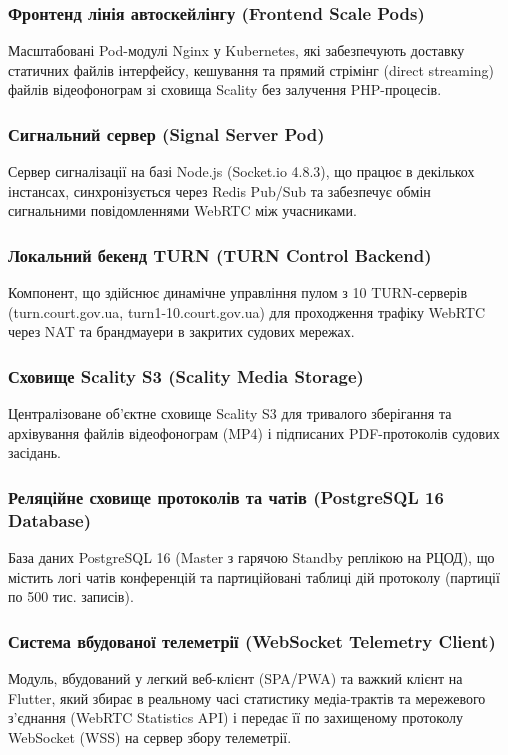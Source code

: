 \documentclass{article}
\begin{document}
\subsubsection{Фронтенд лінія автоскейлінгу (Frontend Scale Pods)}
Масштабовані Pod-модулі Nginx у Kubernetes, які забезпечують доставку статичних файлів інтерфейсу, кешування та прямий стрімінг (direct streaming) файлів відеофонограм зі сховища Scality без залучення PHP-процесів.

\subsubsection{Сигнальний сервер (Signal Server Pod)}
Сервер сигналізації на базі Node.js (Socket.io 4.8.3), що працює в декількох інстансах, синхронізується через Redis Pub/Sub та забезпечує обмін сигнальними повідомленнями WebRTC між учасниками.

\subsubsection{Локальний бекенд TURN (TURN Control Backend)}
Компонент, що здійснює динамічне управління пулом з 10 TURN-серверів (turn.court.gov.ua, turn1-10.court.gov.ua) для проходження трафіку WebRTC через NAT та брандмауери в закритих судових мережах.

\subsubsection{Сховище Scality S3 (Scality Media Storage)}
Централізоване об'єктне сховище Scality S3 для тривалого зберігання та архівування файлів відеофонограм (MP4) і підписаних PDF-протоколів судових засідань.

\subsubsection{Реляційне сховище протоколів та чатів (PostgreSQL 16 Database)}
База даних PostgreSQL 16 (Master з гарячою Standby реплікою на РЦОД), що містить логі чатів конференцій та партиційовані таблиці дій протоколу (партиції по 500 тис. записів).

\subsubsection{Система вбудованої телеметрії (WebSocket Telemetry Client)}
Модуль, вбудований у легкий веб-клієнт (SPA/PWA) та важкий клієнт на Flutter, який збирає в реальному часі статистику медіа-трактів та мережевого з'єднання (WebRTC Statistics API) і передає її по захищеному протоколу WebSocket (WSS) на сервер збору телеметрії.
\end{document}

